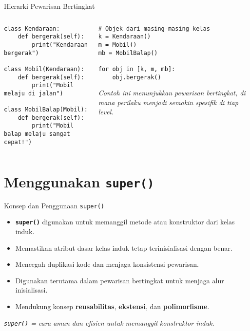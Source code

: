 \documentclass[aspectratio=169, table]{beamer}
\begin{document}
\begin{frame}[fragile]{Hierarki Pewarisan Bertingkat}
\vspace{20pt}
\begin{columns}[t]
\begin{column}{0.55\textwidth}
\begin{lstlisting}[style=PythonStyle]
class Kendaraan:
    def bergerak(self):
        print("Kendaraan bergerak")

class Mobil(Kendaraan):
    def bergerak(self):
        print("Mobil melaju di jalan")

class MobilBalap(Mobil):
    def bergerak(self):
        print("Mobil balap melaju sangat cepat!")
\end{lstlisting}
\end{column}

\begin{column}{0.4\textwidth}
\begin{lstlisting}[style=PythonStyle]
# Objek dari masing-masing kelas
k = Kendaraan()
m = Mobil()
mb = MobilBalap()

for obj in [k, m, mb]:
    obj.bergerak()
\end{lstlisting}

\textit{Contoh ini menunjukkan pewarisan bertingkat, 
di mana perilaku menjadi semakin spesifik di tiap level.}
\end{column}
\end{columns}
\end{frame}



\section{Menggunakan \texttt{super()}}

\begin{frame}[fragile]{Konsep dan Penggunaan \texttt{super()}}
\vspace{20pt}
\begin{itemize}
    \item \textbf{\texttt{super()}} digunakan untuk memanggil metode atau konstruktor dari kelas induk.
    \item Memastikan atribut dasar kelas induk tetap terinisialisasi dengan benar.
    \item Mencegah duplikasi kode dan menjaga konsistensi pewarisan.
    \item Digunakan terutama dalam pewarisan bertingkat untuk menjaga alur inisialisasi.
    \item Mendukung konsep \textbf{reusabilitas}, \textbf{ekstensi}, dan \textbf{polimorfisme}.
\end{itemize}

\begin{center}
\textit{\texttt{super()} = cara aman dan efisien untuk memanggil konstruktor induk.}
\end{center}
\end{frame}
\end{document}
